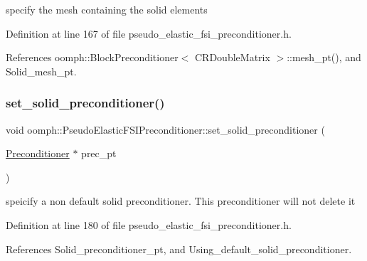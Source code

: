 specify the mesh containing the solid elements 



Definition at line 167 of file pseudo\+\_\+elastic\+\_\+fsi\+\_\+preconditioner.\+h.



References oomph\+::\+Block\+Preconditioner$<$ C\+R\+Double\+Matrix $>$\+::mesh\+\_\+pt(), and Solid\+\_\+mesh\+\_\+pt.

\mbox{\label{classoomph_1_1PseudoElasticFSIPreconditioner_a92e59f83606d77e7407a4ace534546f2}} 
\subsubsection{\texorpdfstring{set\+\_\+solid\+\_\+preconditioner()}{set\_solid\_preconditioner()}}
{\footnotesize\ttfamily void oomph\+::\+Pseudo\+Elastic\+F\+S\+I\+Preconditioner\+::set\+\_\+solid\+\_\+preconditioner (\begin{DoxyParamCaption}\item[{\hyperlink{classoomph_1_1Preconditioner}{Preconditioner} $\ast$}]{prec\+\_\+pt }\end{DoxyParamCaption})\hspace{0.3cm}{\ttfamily [inline]}}



speicify a non default solid preconditioner. This preconditioner will not delete it 



Definition at line 180 of file pseudo\+\_\+elastic\+\_\+fsi\+\_\+preconditioner.\+h.



References Solid\+\_\+preconditioner\+\_\+pt, and Using\+\_\+default\+\_\+solid\+\_\+preconditioner.

\mbox{\label{classoomph_1_1PseudoElasticFSIPreconditioner_a460ad5eea59f4c07dfde8b11696fabb1}} 
